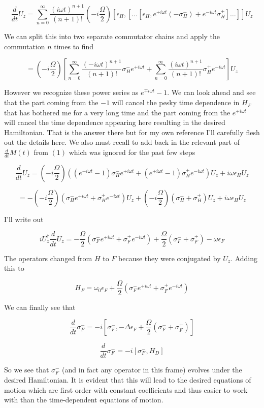 \documentclass[12pt]{article}
\begin{document}
$$
\frac{d}{dt} U_z = \sum_{n=0}^{\infty} \frac{(i\omega t)^{n+1}}{(n+1)!} \left(-i\frac{\Omega}{2}\right)\left[\epsilon_H,\left[\ldots\left[\epsilon_H,e^{+i\omega t}(-\sigma^-_H) + e^{-i\omega t}\sigma^+_H\right]\ldots \right]\right] U_z
$$

We can split this into two separate commutator chains and apply the commutation $n$ times to find

$$
= \left(-i\frac{\Omega}{2}\right)\left[\sum_{n=0}^{\infty} \frac{(-i \omega t)^{n+1}}{(n+1)!} \sigma^-_H e^{+i\omega t} + \sum_{n=0}^{\infty} \frac{(i \omega t)^{n+1}}{(n+1)!} \sigma^+_H e^{-i\omega t}\right]U_z
$$

However we recognize these power series as $e^{\mp i\omega t}-1$. We can look ahead and see that the part coming from the $-1$ will cancel the pesky time dependence in $H_F$ that has bothered me for a very long time and the part coming from the $e^{\mp i \omega t}$ will cancel the time dependence appearing here resulting in the desired Hamiltonian. That is the answer there but for my own reference I'll carefully flesh out the details here. We also must recall to add back in the relevant part of $\frac{d}{dt}M(t)$ from $(1)$ which was ignored for the past few steps

$$
\frac{d}{dt}U_z = \left(-i\frac{\Omega}{2} \right)\left( \left(e^{-i\omega t}-1\right) \sigma^-_H e^{+i\omega t} + \left(e^{+i\omega t}-1\right)\sigma^+_H e^{-i\omega t}\right)U_z + i\omega \epsilon_HU_z
$$

$$
= -\left(-i\frac{\Omega}{2}\right)\left(\sigma^-_H e^{+i\omega t} + \sigma^+_H e^{-i\omega t} \right)U_z + \left(-i\frac{\Omega}{2}\right)\left(\sigma^-_H + \sigma^+_H \right)U_z + i\omega \epsilon_H U_z
$$

I'll write out

$$
i U_z^{\dagger}\frac{d}{dt}U_z = -\frac{\Omega}{2}\left(\sigma^-_F e^{+i\omega t} + \sigma^+_F e^{-i\omega t} \right) + \frac{\Omega}{2}\left(\sigma^-_F  + \sigma^+_F \right) - \omega \epsilon_F
$$

The operators changed from $H$ to $F$ because they were conjugated by $U_z$.
Adding this to

$$
H_F = \omega_0 \epsilon_F + \frac{\Omega}{2}\left(\sigma^-_F e^{+i\omega t} + \sigma^+_F e^{-i\omega t} \right)
$$

We can finally see that

$$
\frac{d}{dt}\sigma^-_F = -i\left[\sigma^-_F,-\Delta \epsilon_F + \frac{\Omega}{2}\left(\sigma^-_F + \sigma^+_F \right) \right]
$$

$$
\frac{d}{dt}\sigma^-_F = -i\left[\sigma^-_F, H_D\right]
$$

So we see that $\sigma^-_F$ (and in fact any operator in this frame) evolves under the desired Hamiltonian. It is evident that this will lead to the desired equations of motion which are first order with constant coefficients and thus easier to work with than the time-dependent equations of motion.
\end{document}
